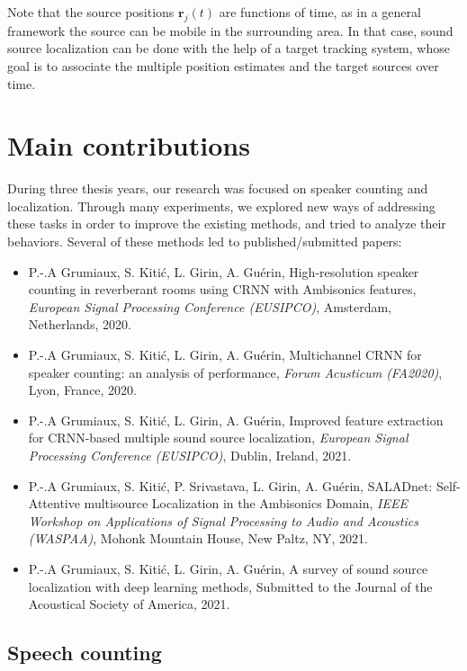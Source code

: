 Note that the source positions $\mathbf{r}_j(t)$ are functions of time, as in a general framework the source can be mobile in the surrounding area. In that case, sound source localization can be done with the help of a target tracking system, whose goal is to associate the multiple position estimates and the target sources over time.

\section{Main contributions}

During three thesis years, our research was focused on speaker counting and localization. Through many experiments, we explored new ways of addressing these tasks in order to improve the existing methods, and tried to analyze their behaviors. Several of these methods led to published/submitted papers:

\begin{itemize}
    \item P.-.A Grumiaux, S. Kiti\'c, L. Girin, A. Guérin, High-resolution speaker counting in reverberant rooms using CRNN with Ambisonics features, \textit{European Signal Processing Conference (EUSIPCO)}, Amsterdam, Netherlands, 2020. 
    \item P.-.A Grumiaux, S. Kiti\'c, L. Girin, A. Guérin, Multichannel CRNN for speaker counting: an analysis of performance, \textit{Forum Acusticum (FA2020)}, Lyon, France, 2020. 
    \item P.-.A Grumiaux, S. Kiti\'c, L. Girin, A. Guérin, Improved feature extraction for CRNN-based multiple sound source localization, \textit{European Signal Processing Conference (EUSIPCO)}, Dublin, Ireland, 2021. 
    \item P.-.A Grumiaux, S. Kiti\'c, P. Srivastava, L. Girin, A. Guérin, SALADnet: Self-Attentive multisource Localization in the Ambisonics Domain, \textit{IEEE Workshop on Applications of Signal Processing to Audio and Acoustics (WASPAA)}, Mohonk Mountain House, New Paltz, NY, 2021.
    \item P.-.A Grumiaux, S. Kiti\'c, L. Girin, A. Guérin, A survey of sound source localization with deep learning methods, Submitted to the Journal of the Acoustical Society of America, 2021.
\end{itemize}

\subsection{Speech counting}

